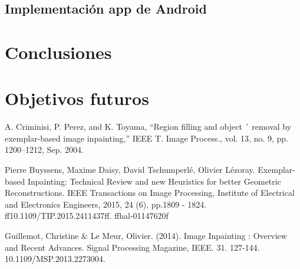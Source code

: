 \documentclass[conference]{IEEEtran}
\begin{document}
\subsection{Implementación app de Android}

\section{Conclusiones}

\section{Objetivos futuros}


\begin{thebibliography}{00}
 A. Criminisi, P. Perez, and K. Toyama, “Region filling and object ´
removal by exemplar-based image inpainting,” IEEE T. Image Process.,
vol. 13, no. 9, pp. 1200–1212, Sep. 2004.

 Pierre Buyssens, Maxime Daisy, David Tschumperlé, Olivier Lézoray. Exemplar-based Inpainting:
Technical Review and new Heuristics for better Geometric Reconstructions. IEEE Transactions on
Image Processing, Institute of Electrical and Electronics Engineers, 2015, 24 (6), pp.1809 - 1824.
ff10.1109/TIP.2015.2411437ff. ffhal-01147620f

 Guillemot, Christine \& Le Meur, Olivier. (2014). Image Inpainting : Overview and Recent Advances. Signal Processing Magazine, IEEE. 31. 127-144. 10.1109/MSP.2013.2273004. 

\end{thebibliography}
\end{document}

